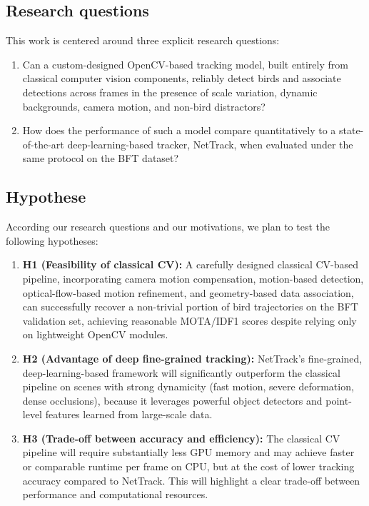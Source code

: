 \subsection{Research questions}
\label{sec:research_questions}

This work is centered around three explicit research questions:

\begin{enumerate}
    \item Can a custom-designed OpenCV-based tracking model, built entirely from classical computer vision components, reliably detect birds and associate detections across frames in the presence of scale variation, dynamic backgrounds, camera motion, and non-bird distractors?
    \item How does the performance of such a model compare quantitatively to a state-of-the-art deep-learning-based tracker, NetTrack, when evaluated under the same protocol on the BFT dataset?
\end{enumerate}

\subsection{Hypothese}
\label{sec:hypothese}

According our research questions and our motivations, we plan to test the following hypotheses:

\begin{enumerate}
    \item \textbf{H1 (Feasibility of classical CV):} A carefully designed classical CV-based pipeline, incorporating camera motion compensation, motion-based detection, optical-flow-based motion refinement, and geometry-based data association, can successfully recover a non-trivial portion of bird trajectories on the BFT validation set, achieving reasonable MOTA/IDF1 scores despite relying only on lightweight OpenCV modules.
    \item \textbf{H2 (Advantage of deep fine-grained tracking):} NetTrack’s fine-grained, deep-learning-based framework will significantly outperform the classical pipeline on scenes with strong dynamicity (fast motion, severe deformation, dense occlusions), because it leverages powerful object detectors and point-level features learned from large-scale data.
    \item \textbf{H3 (Trade-off between accuracy and efficiency):} The classical CV pipeline will require substantially less GPU memory and may achieve faster or comparable runtime per frame on CPU, but at the cost of lower tracking accuracy compared to NetTrack. This will highlight a clear trade-off between performance and computational resources.
\end{enumerate}

